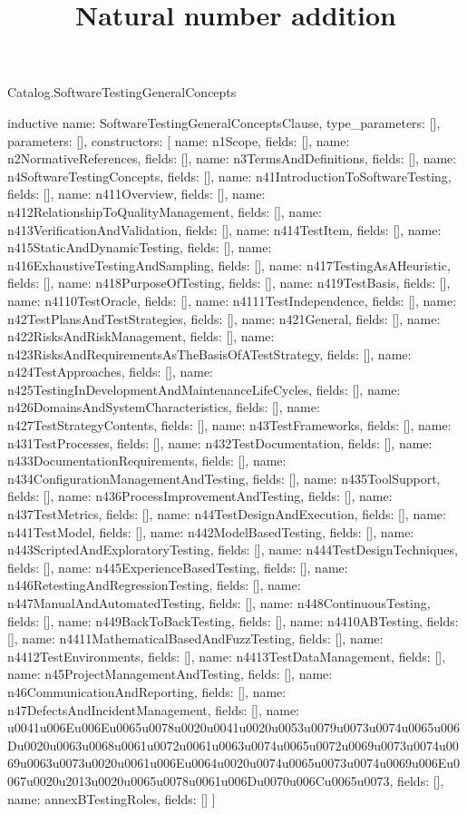 \begin{lexlean}{Catalog.SoftwareTestingGeneralConcepts}
\title{Natural number addition}
\begin{semanticmodule}
inductive{
  name: SoftwareTestingGeneralConceptsClause,
  type_parameters: [],
  parameters: [],
  constructors: [
    {name: n1Scope, fields: []},
    {name: n2NormativeReferences, fields: []},
    {name: n3TermsAndDefinitions, fields: []},
    {name: n4SoftwareTestingConcepts, fields: []},
    {name: n41IntroductionToSoftwareTesting, fields: []},
    {name: n411Overview, fields: []},
    {name: n412RelationshipToQualityManagement, fields: []},
    {name: n413VerificationAndValidation, fields: []},
    {name: n414TestItem, fields: []},
    {name: n415StaticAndDynamicTesting, fields: []},
    {name: n416ExhaustiveTestingAndSampling, fields: []},
    {name: n417TestingAsAHeuristic, fields: []},
    {name: n418PurposeOfTesting, fields: []},
    {name: n419TestBasis, fields: []},
    {name: n4110TestOracle, fields: []},
    {name: n4111TestIndependence, fields: []},
    {name: n42TestPlansAndTestStrategies, fields: []},
    {name: n421General, fields: []},
    {name: n422RisksAndRiskManagement, fields: []},
    {name: n423RisksAndRequirementsAsTheBasisOfATestStrategy, fields: []},
    {name: n424TestApproaches, fields: []},
    {name: n425TestingInDevelopmentAndMaintenanceLifeCycles, fields: []},
    {name: n426DomainsAndSystemCharacteristics, fields: []},
    {name: n427TestStrategyContents, fields: []},
    {name: n43TestFrameworks, fields: []},
    {name: n431TestProcesses, fields: []},
    {name: n432TestDocumentation, fields: []},
    {name: n433DocumentationRequirements, fields: []},
    {name: n434ConfigurationManagementAndTesting, fields: []},
    {name: n435ToolSupport, fields: []},
    {name: n436ProcessImprovementAndTesting, fields: []},
    {name: n437TestMetrics, fields: []},
    {name: n44TestDesignAndExecution, fields: []},
    {name: n441TestModel, fields: []},
    {name: n442ModelBasedTesting, fields: []},
    {name: n443ScriptedAndExploratoryTesting, fields: []},
    {name: n444TestDesignTechniques, fields: []},
    {name: n445ExperienceBasedTesting, fields: []},
    {name: n446RetestingAndRegressionTesting, fields: []},
    {name: n447ManualAndAutomatedTesting, fields: []},
    {name: n448ContinuousTesting, fields: []},
    {name: n449BackToBackTesting, fields: []},
    {name: n4410ABTesting, fields: []},
    {name: n4411MathematicalBasedAndFuzzTesting, fields: []},
    {name: n4412TestEnvironments, fields: []},
    {name: n4413TestDataManagement, fields: []},
    {name: n45ProjectManagementAndTesting, fields: []},
    {name: n46CommunicationAndReporting, fields: []},
    {name: n47DefectsAndIncidentManagement, fields: []},
    {name: u0041u006Eu006Eu0065u0078u0020u0041u0020u0053u0079u0073u0074u0065u006Du0020u0063u0068u0061u0072u0061u0063u0074u0065u0072u0069u0073u0074u0069u0063u0073u0020u0061u006Eu0064u0020u0074u0065u0073u0074u0069u006Eu0067u0020u2013u0020u0065u0078u0061u006Du0070u006Cu0065u0073, fields: []},
    {name: annexBTestingRoles, fields: []}
  ]
}


\end{semanticmodule}
\end{lexlean}
